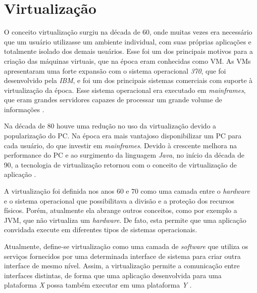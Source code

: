 \chapter{Virtualização}
\label{cap:virtualizacao}

O conceito virtualização surgiu na década de 60, onde muitas vezes era necessário que um usuário utilizasse um ambiente individual, 
com suas próprias aplicações e totalmente isolado dos demais usuários. Esse foi um dos principais motivos para a criação das máquinas 
virtuais, que na época eram conhecidas como \ac{VM}. As \ac{VM}s apresentaram uma forte expansão com o sistema operacional \textit{370}, que foi 
desenvolvido pela \textit{IBM}, e foi um dos principais sistemas comerciais com suporte à virtualização da época. Esse sistema operacional 
era executado em \textit{mainframes}, que eram grandes servidores capazes de processar um grande volume de informações \cite{laureano2008}. 

Na década de 80 houve uma redução no uso da virtualização devido a popularização do \ac{PC}. Na época era mais vantajoso disponibilizar 
um \ac{PC} para cada usuário, do que investir em \textit{mainframes}. Devido à crescente melhora na performance do \ac{PC} e
ao surgimento da linguagem \textit{Java}, no início da década de 90, a tecnologia de virtualização retornou com o conceito de virtualização
de aplicação \cite{laureano2008}.

A virtualização foi definida nos anos 60 e 70 como uma camada entre o \textit{hardware} e o sistema operacional que possibilitava a 
divisão e a proteção dos recursos físicos. Porém, atualmente ela abrange outros conceitos, como por exemplo a \ac{JVM}, que não virtualiza
um \textit{hardware}. De fato, esta permite que uma aplicação convidada execute em diferentes tipos de sistemas operacionais.

Atualmente, define-se virtualização como uma camada de \textit{software} que utiliza os serviços fornecidos por uma determinada interface de 
sistema para criar outra interface de mesmo nível. Assim, a virtualização permite a comunicação entre interfaces distintas, de forma que uma 
aplicação desenvolvida para uma plataforma \textit{X} possa também executar em uma plataforma \textit{Y} \cite{laureano2008}.

